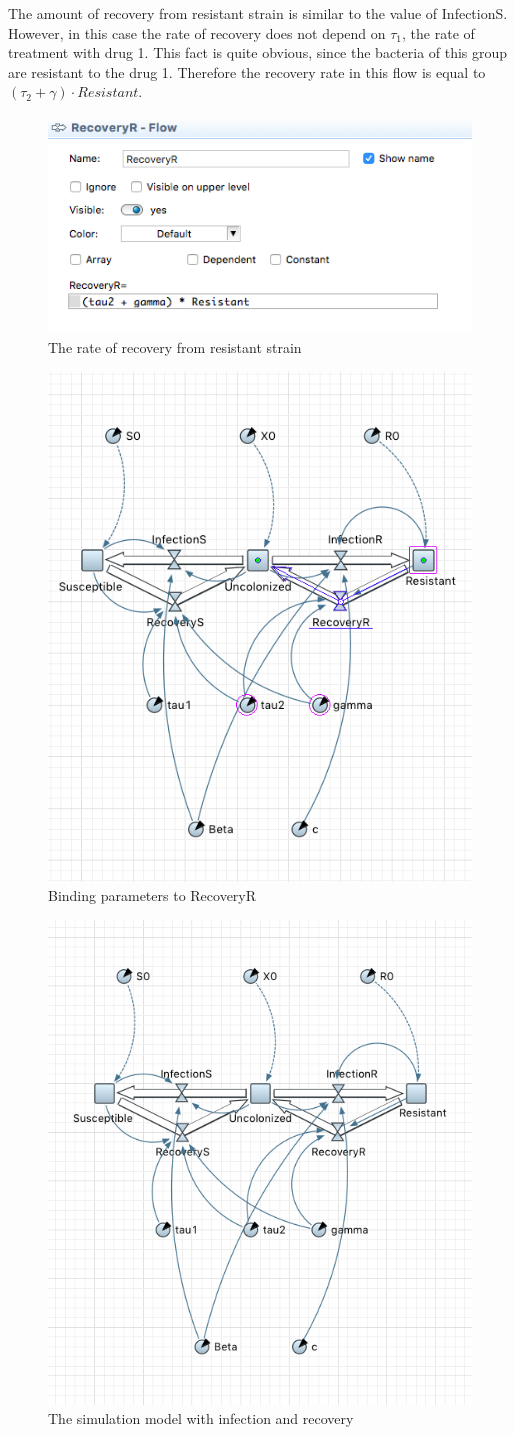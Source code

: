 The amount of recovery from resistant strain is similar to the value of InfectionS. However, in this case the rate of recovery does not depend on $\tau_1$, the rate of treatment with drug 1. This fact is quite obvious, since the bacteria of this group are resistant to the drug 1. Therefore the recovery rate in this flow is equal to $(\tau_2 + \gamma) \cdot Resistant$.

\begin{figure}[H]
  \centering
  \includegraphics[height=0.3\textwidth]{img/screens/recovery/recovery10}
  \caption{The rate of recovery from resistant strain}
\end{figure}

\begin{figure}[H]
  \centering
  \includegraphics[height=0.6\textwidth]{img/screens/recovery/recovery9}
  \caption{Binding parameters to RecoveryR}
\end{figure}

\begin{figure}[H]
  \centering
  \includegraphics[height=0.6\textwidth]{img/screens/recovery/recovery11}
  \caption{The simulation model with infection and recovery}
\end{figure}